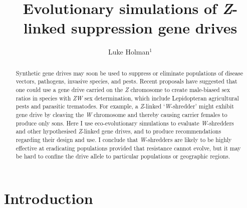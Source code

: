 \documentclass[]{rsos}%
\begin{document}
\title{Evolutionary simulations of \emph{Z}-linked suppression gene drives}

\author{
Luke Holman$^{1}$}

\address{
  $^{1}$School of BioSciences, The University of Melbourne, Victoria 3010,
Australia.}
\subject{
Evolutionary biology,
Theoretical modelling,
Gene drives}



\begin{abstract}
Synthetic gene drives may soon be used to suppress or eliminate
populations of disease vectors, pathogens, invasive species, and pests.
Recent proposals have suggested that one could use a gene drive carried
on the \emph{Z} chromosome to create male-biased sex ratios in species
with \emph{ZW} sex determination, which include Lepidopteran
agricultural pests and parasitic trematodes. For example, a
\emph{Z}-linked `\emph{W}-shredder' might exhibit gene drive by cleaving
the \emph{W} chromosome and thereby causing carrier females to produce
only sons. Here I use eco-evolutionary simulations to evaluate
\emph{W}-shredders and other hypothesised \emph{Z}-linked gene drives,
and to produce recommendations regarding their design and use. I
conclude that \emph{W}-shredders are likely to be highly effective at
eradicating populations provided that resistance cannot evolve, but it
may be hard to confine the drive allele to particular populations or
geographic regions.
\end{abstract}

\providecommand{\tightlist}{%
  \setlength{\itemsep}{0pt}\setlength{\parskip}{0pt}}
\providecommand{\EndFirstPage}{%
}

\maketitle

\hypertarget{introduction}{%
\section{Introduction}\label{introduction}}
\end{document}
